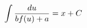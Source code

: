 \documentclass[preview]{standalone}
\begin{document}
\begin{align*}
\special{dvisvgm:raw <g id='unique000'>}\int \frac{du}{b f(u) + a} = x + C\special{dvisvgm:raw </g>}
\end{align*}
\end{document}
